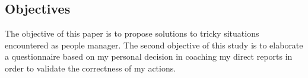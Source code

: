 \subsection{Objectives}
\label{sub-sec:objectives}


The objective of this paper is to propose solutions to tricky situations encountered as people manager. The second objective of this study is to elaborate a questionnaire based on my personal decision in coaching my direct reports in order to validate the correctness of my actions.